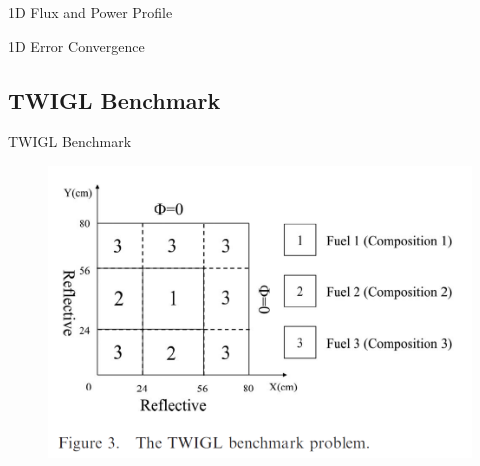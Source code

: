 \documentclass[8pt]{beamer}
\begin{document}
\begin{frame}{1D Flux and Power Profile}

\end{frame}

\begin{frame}{1D Error Convergence}
%
%
%
\end{frame}


\subsection{TWIGL Benchmark}

\begin{frame}{TWIGL Benchmark}

\begin{figure}[h]
\includegraphics[width=\linewidth]{figures/twigl_geom.png}
\end{figure}

\end{frame}
\end{document}
